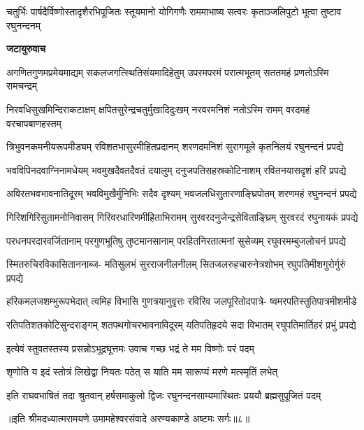 \threelineshloka
{चतुर्भिः पार्षदैर्विष्णोस्तादृशैरभिपूजितः}
{स्तूयमानो योगिगणैः राममाभाष्य सत्वरः}
{कृताञ्जलिपुटो भूत्वा तुष्टाव रघुनन्दनम्} %

\textbf{जटायुरुवाच}

\fourlineindentedshloka
{अगणितगुणमप्रमेयमाद्यम्}
{सकलजगत्स्थितिसंयमादिहेतुम्}
{उपरमपरमं परात्मभूतम्}
{सततमहं प्रणतोऽस्मि रामचन्द्रम्} %

\fourlineindentedshloka
{निरवधिसुखमिन्दिराकटाक्षम्}
{क्षपितसुरेन्द्रचतुर्मुखादिदुःखम्}
{नरवरमनिशं नतोऽस्मि रामम्}
{वरदमहं वरचापबाणहस्तम्} %

\fourlineindentedshloka
{त्रिभुवनकमनीयरूपमीड्यम्}
{रविशतभासुरमीहितप्रदानम्}
{शरणदमनिशं सुरागमूले}
{कृतनिलयं रघुनन्दनं प्रपद्ये} %

\fourlineindentedshloka
{भवविपिनदवाग्निनामधेयम्}
{भवमुखदैवतदैवतं दयालुम्}
{दनुजपतिसहस्रकोटिनाशम्}
{रवितनयासदृशं हरिं प्रपद्ये} %

\fourlineindentedshloka
{अविरतभवभावनातिदूरम्}
{भवविमुखैर्मुनिभिः सदैव दृश्यम्}
{भवजलधिसुतारणाङ्घ्रिपोतम्}
{शरणमहं रघुनन्दनं प्रपद्ये} %

\fourlineindentedshloka
{गिरिशगिरिसुतामनोनिवासम्}
{गिरिवरधारिणमीहिताभिरामम्}
{सुरवरदनुजेन्द्रसेविताङ्घ्रिम्}
{सुरवरदं रघुनायकं प्रपद्ये} %

\fourlineindentedshloka
{परधनपरदारवर्जितानाम्}
{परगुणभूतिषु तुष्टमानसानाम्}
{परहितनिरतात्मनां सुसेव्यम्}
{रघुवरमम्बुजलोचनं प्रपद्ये} %

\fourlineindentedshloka
{स्मितरुचिरविकासिताननाब्ज-}
{मतिसुलभं सुरराजनीलनीलम्}
{सितजलरुहचारुनेत्रशोभम्}
{रघुपतिमीशगुरोर्गुरुं प्रपद्ये} %

\fourlineindentedshloka
{हरिकमलजशम्भुरूपभेदात्}
{त्वमिह विभासि गुणत्रयानुवृत्तः}
{रविरिव जलपूरितोदपात्रे-}
{ष्वमरपतिस्तुतिपात्रमीशमीडे} %

\fourlineindentedshloka
{रतिपतिशतकोटिसुन्दराङ्गम्}
{शतपथगोचरभावनाविदूरम्}
{यतिपतिहृदये सदा विभातम्}
{रघुपतिमार्तिहरं प्रभुं प्रपद्ये} %

\twolineshloka
{इत्येवं स्तुवतस्तस्य प्रसन्नोऽभूद्रघूत्तमः}
{उवाच गच्छ भद्रं ते मम विष्णोः परं पदम्} %

\twolineshloka
{शृणोति य इदं स्तोत्रं लिखेद्वा नियतः पठेत्}
{स याति मम सारूप्यं मरणे मत्स्मृतिं लभेत्} %

\fourlineindentedshloka
{इति राघवभाषितं तदा}
{श्रुतवान् हर्षसमाकुलो द्विजः}
{रघुनन्दनसाम्यमास्थितः}
{प्रययौ ब्रह्मसुपूजितं पदम्} %

{॥इति श्रीमदध्यात्मरामयणे उमामहेश्वरसंवादे
अरण्यकाण्डे अष्टमः सर्गः॥८॥
}



